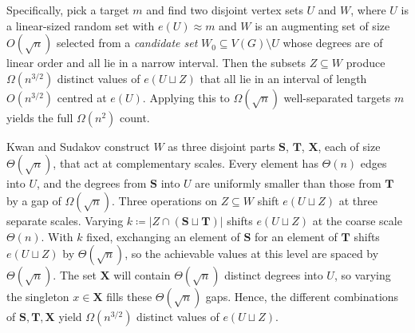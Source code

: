 Specifically, pick a target $m$ and find two disjoint vertex sets $U$ and $W$, where $U$ is a linear-sized random set with $e(U) \approx m$ and $W$ is an augmenting set of size $O(\sqrt{n})$ selected from a \textit{candidate set} $W_0 \subseteq V(G) \setminus U$ whose degrees are of linear order and all lie in a narrow interval. Then the subsets $Z \subseteq W$ produce $\Omega(n^{3/2})$ distinct values of $e(U \sqcup Z)$ that all lie in an interval of length $O(n^{3/2})$ centred at $e(U)$. Applying this to $\Omega(\sqrt{n})$ well-separated targets $m$ yields the full $\Omega(n^2)$ count.

Kwan and Sudakov construct $W$ as three disjoint parts $\mathbf{S}$, $\mathbf{T}$, $\mathbf{X}$, each of size $\Theta(\sqrt{n})$, that act at complementary scales. Every element has $\Theta(n)$ edges into $U$, and the degrees from $\mathbf{S}$ into $U$ are uniformly smaller than those from $\mathbf{T}$ by a gap of $\Omega(\sqrt{n})$. Three operations on $Z \subseteq W$ shift $e(U \sqcup Z)$ at three separate scales. Varying $k \coloneqq |Z \cap (\mathbf{S} \sqcup \mathbf{T})|$ shifts $e(U \sqcup Z)$ at the coarse scale $\Theta(n)$. With $k$ fixed, exchanging an element of $\mathbf{S}$ for an element of $\mathbf{T}$ shifts $e(U \sqcup Z)$ by $\Theta(\sqrt{n})$, so the achievable values at this level are spaced by $\Theta(\sqrt{n})$. The set $\mathbf{X}$ will contain $\Theta(\sqrt{n})$ distinct degrees into $U$, so varying the singleton $x \in \mathbf{X}$ fills these $\Theta(\sqrt{n})$ gaps. Hence, the different combinations of $\mathbf{S}, \mathbf{T}, \mathbf{X}$ yield $\Omega(n^{3/2})$ distinct values of $e(U \sqcup Z)$.


